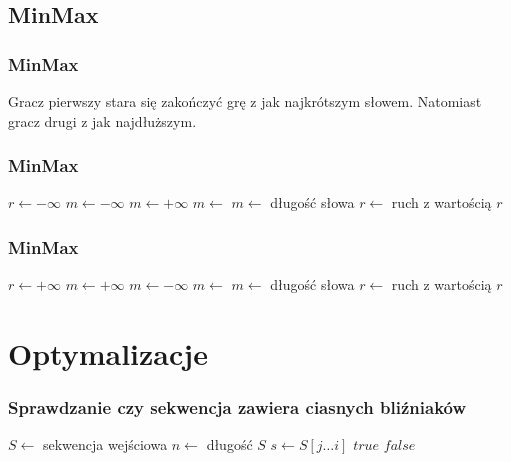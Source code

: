 \documentclass{beamer}
\begin{document}
\subsection{MinMax}

\begin{frame}
\frametitle{MinMax}

Gracz pierwszy stara się zakończyć grę z jak najkrótszym słowem.
Natomiast gracz drugi z jak najdłuższym.

\end{frame}

\begin{frame}
\frametitle{MinMax}

\begin{algorithmic}
	\State $r \gets -\infty$
			\State $m \gets -\infty$
					\State $m \gets +\infty$ 
				\Else
					\State $m \gets $ 
				\EndIf
			\Else
				\State $m \gets $ długość słowa 
			\EndIf
			\State $r \gets $ 
	\EndFor
	\State
	\Return ruch z wartością $r$
\EndFunction
\end{algorithmic}

\end{frame}

\begin{frame}
\frametitle{MinMax}

\begin{algorithmic}
	\State $r \gets +\infty$
			\State $m \gets +\infty$
					\State $m \gets -\infty$ 
				\Else
					\State $m \gets $ 
				\EndIf
			\Else
				\State $m \gets $ długość słowa 
			\EndIf
			\State $r \gets $ 
	\EndFor
	\State
	\Return ruch z wartością $r$
\EndFunction
\end{algorithmic}

\end{frame}

\section{Optymalizacje}

\begin{frame}
\frametitle{Sprawdzanie czy sekwencja zawiera ciasnych bliźniaków}

\begin{algorithmic}
\State $S \gets $ sekwencja wejściowa
\State $n \gets $ długość $S$
 
		\State $s \gets S[j \dots i]$
			\State
		    \Return $true$
	    \EndIf
	\EndFor
\EndFor
\State
\Return $false$
\end{algorithmic}
\end{frame}
\end{document}
